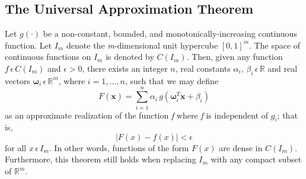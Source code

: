 \subsection{The Universal Approximation Theorem}
Let $g(\cdot)$ be a non-constant, bounded, and monotonically-increasing continuous function. Let $I_m$ denote the \textit{m}-dimensional unit hypercube $[0, 1]^m$. The space of continuous functions on $I_m$ is denoted by $C(I_m)$. Then, given any function $f\,\epsilon\,C(I_m)$ and $\epsilon > 0$, there exists an integer $n$, real constants $\alpha_i$, $\beta_i\,\epsilon\,\mathbb{R}$ and real vectors $\boldsymbol{\omega}_i \,\epsilon\,\mathbb{R}^m$, where $i=1,...,n$, such that we may define
\begin{equation*}
F(\textbf{x}) = \sum_{i=1}^{n} \alpha_i\,g(\boldsymbol{\omega}^T_i\textbf{x} + \beta_i)
\end{equation*}
as an approximate realization of the function \textit{f} where \textit{f} is independent of $g_i$; that is,
\begin{equation*}
|F(x) - f(x)| < \epsilon
\end{equation*}
for all $x\,\epsilon\,I_m$. In other words, functions of the form $F(x)$ are dense in $C(I_m)$. Furthermore, this theorem still holds when replacing $I_m$ with any compact subset of $\mathbb{R}^m$. 

